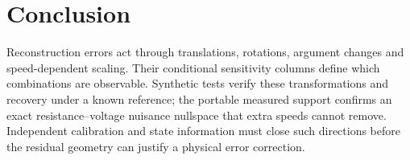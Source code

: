 \section{Conclusion}
Reconstruction errors act through translations, rotations, argument changes
and speed-dependent scaling. Their conditional sensitivity columns define
which combinations are observable. Synthetic tests verify these transformations
and recovery under a known reference; the portable measured support confirms
an exact resistance--voltage nuisance nullspace that extra speeds cannot remove.
Independent calibration and state information must close such directions
before the residual geometry can justify a physical error correction.
